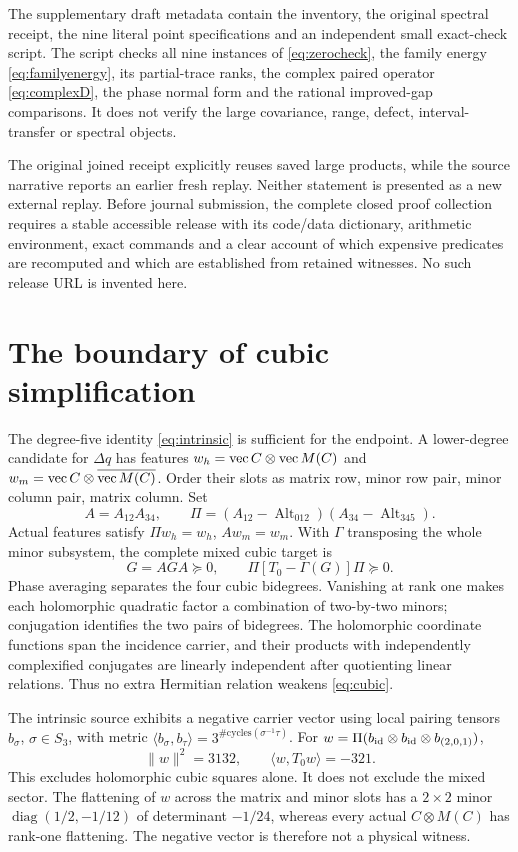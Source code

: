 \documentclass[11pt,a4paper]{article}
\theoremstyle{definition}\newtheorem{definition}[theorem]{Definition}
\theoremstyle{remark}\newtheorem{remark}[theorem]{Remark}
\DeclareMathOperator{\Alt}{Alt}\DeclareMathOperator{\diag}{diag}
\numberwithin{equation}{section}
\begin{document}
The supplementary draft metadata contain the inventory, the original
spectral receipt, the nine literal point specifications and an
independent small exact-check script. The script checks all nine
instances of \eqref{eq:zerocheck}, the family energy
\eqref{eq:familyenergy}, its partial-trace ranks, the complex paired
operator \eqref{eq:complexD}, the phase normal form and the rational
improved-gap comparisons. It does not verify the large covariance,
range, defect, interval-transfer or spectral objects.

The original joined receipt explicitly reuses saved large products,
while the source narrative reports an earlier fresh replay.
Neither statement is presented as a new external replay.
Before journal submission, the complete closed proof collection
requires a stable accessible release with its code/data dictionary,
arithmetic environment, exact commands and a clear account of
which expensive predicates are recomputed and which are established
from retained witnesses. No such release URL is invented here.

\section{The boundary of cubic simplification}\label{app:cubic}
The degree-five identity \eqref{eq:intrinsic} is sufficient for the
endpoint. A lower-degree candidate for $\Delta q$ has features
$w_h=\operatorname{vec} C\otimes\operatorname{vec} M(C)$ and
$w_m=\operatorname{vec} C\otimes\overline{\operatorname{vec} M(C)}$.
Order their slots as matrix row, minor row pair, minor column pair,
matrix column. Set
\[
A=A_{12}A_{34},\qquad
\Pi=(A_{12}-\Alt_{012})(A_{34}-\Alt_{345}).
\]
Actual features satisfy $\Pi w_h=w_h$, $Aw_m=w_m$.
With $\Gamma$ transposing the whole minor subsystem, the complete
mixed cubic target is
\begin{equation}
G=AGA\succeq0,\qquad
\Pi[T_0-\Gamma(G)]\Pi\succeq0.
\label{eq:cubic}
\end{equation}
Phase averaging separates the four cubic bidegrees.
Vanishing at rank one makes each holomorphic quadratic factor
a combination of two-by-two minors; conjugation identifies the two
pairs of bidegrees. The holomorphic coordinate functions span the
incidence carrier, and their products with independently complexified
conjugates are linearly independent after quotienting linear relations.
Thus no extra Hermitian relation weakens \eqref{eq:cubic}.

The intrinsic source \cite{compound} exhibits a negative carrier
vector using local pairing tensors $b_\sigma$, $\sigma\in S_3$,
with metric
$\langle b_\sigma,b_\tau\rangle=3^{\#\mathrm{cycles}(\sigma^{-1}\tau)}$.
For $w=\Pi(b_{\rm id}\otimes b_{\rm id}\otimes b_{(2,0,1)})$,
\[
\|w\|^2=3132,\qquad \langle w,T_0w\rangle=-321.
\]
This excludes holomorphic cubic squares alone.
It does not exclude the mixed sector.
The flattening of $w$ across the matrix and minor slots has a
$2\times2$ minor $\diag(1/2,-1/12)$ of determinant $-1/24$,
whereas every actual $C\otimes M(C)$ has rank-one flattening.
The negative vector is therefore not a physical witness.
\end{document}
